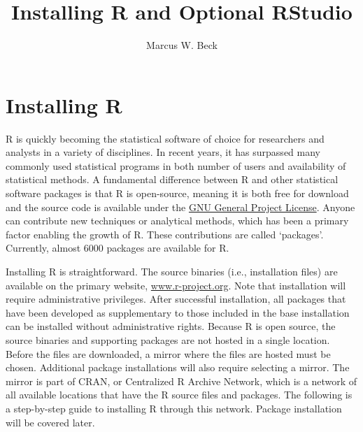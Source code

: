 \documentclass[letterpaper,12pt]{article}\usepackage[]{graphicx}\usepackage[]{color}
\begin{document}
\setlength{\parskip}{5mm}
\setlength{\parindent}{0in}

\title{Installing R and Optional RStudio}
\author{Marcus W. Beck}
\maketitle

\section{Installing R}

R is quickly becoming the statistical software of choice for researchers and analysts in a variety of disciplines.  In recent years, it has surpassed many commonly used statistical programs in both number of users and availability of statistical methods.  A fundamental difference between R and other statistical software packages is that R is open-source, meaning it is both free for download and the source code is available under the \href{http://www.gnu.org/licenses/gpl-2.0.html}{GNU General Project License}.  Anyone can contribute new techniques or analytical methods, which has been a primary factor enabling the growth of R.  These contributions are called `packages'.  Currently, almost 6000 packages are available for R.   

Installing R is straightforward.  The source binaries (i.e., installation files) are available on the primary website, \href{http://www.r-project.org}{www.r-project.org}.  Note that installation will require administrative privileges.  After successful installation, all packages that have been developed as supplementary to those included in the base installation can be installed without administrative rights.  Because R is open source, the source binaries and supporting packages are not hosted in a single location.  Before the files are downloaded, a mirror where the files are hosted must be chosen.  Additional package installations will also require selecting a mirror.  The mirror is part of CRAN, or Centralized R Archive Network, which is a network of all available locations that have the R source files and packages.  The following is a step-by-step guide to installing R through this network.  Package installation will be covered later.
\end{document}
